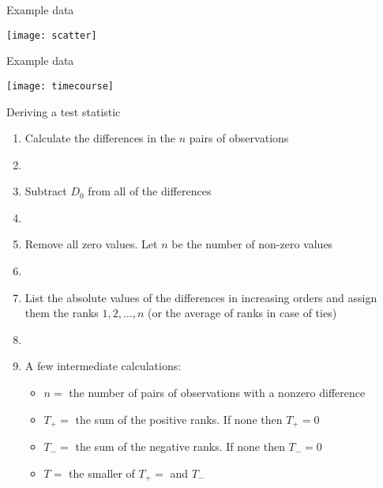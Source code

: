 \documentclass[xcolor=dvipsnames]{beamer}
\begin{document}
\begin{frame}{Example data}
	\begin{center}
		\texttt{[image: scatter]}
	\end{center}
\end{frame}

\begin{frame}{Example data}
\begin{center}
	\texttt{[image: timecourse]}
\end{center}
\end{frame}

\begin{frame}{Deriving a test statistic}
\begin{enumerate}
	\item Calculate the differences in the $n$ pairs of observations \pause
	\item[]
	\item Subtract $D_0$ from all of the differences \pause
	\item[]
	\item Remove all zero values. Let $n$ be the number of non-zero values \pause
	\item[]
	\item List the absolute values of the differences in increasing orders and assign them the ranks $1, 2, \hdots, n$ (or the average of ranks in case of ties) \pause
	\item[]
	\item A few intermediate calculations: \pause
	\begin{itemize}
		\item $n =$ the number of pairs of observations with a nonzero difference \pause
		\item $T_+ = $  the sum of the positive ranks. If none then $T_+=0$ \pause
		\item $T_- = $ the sum of the negative ranks. If none then $T_- = 0$ \pause
		\item $T = $ the smaller of $T_+ = $ and $T_-$ 
	\end{itemize}
\end{enumerate}
\end{frame}
\end{document}
